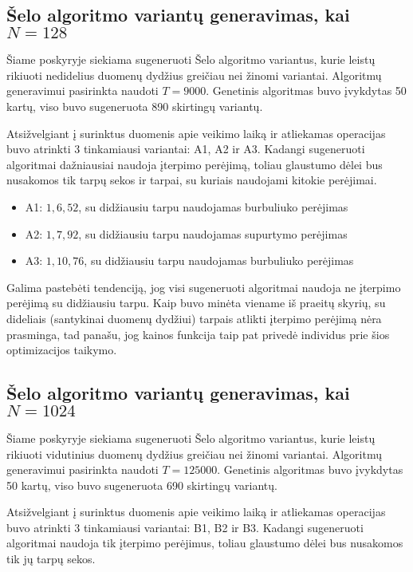 \documentclass{VUMIFInfBakalaurinis}
\begin{document}
\subsection{Šelo algoritmo variantų generavimas, kai $N = 128$}

Šiame poskyryje siekiama sugeneruoti Šelo algoritmo variantus,
kurie leistų rikiuoti nedidelius duomenų dydžius greičiau nei žinomi variantai.
Algoritmų generavimui pasirinkta naudoti $T = 9000$.
Genetinis algoritmas buvo įvykdytas 50 kartų, viso buvo sugeneruota 890 skirtingų variantų.

Atsižvelgiant į surinktus duomenis apie veikimo laiką ir atliekamas operacijas buvo atrinkti 3 tinkamiausi variantai: A1, A2 ir A3.
Kadangi sugeneruoti algoritmai dažniausiai naudoja įterpimo perėjimą, toliau glaustumo dėlei bus nusakomos tik tarpų sekos ir tarpai, su kuriais naudojami kitokie perėjimai.

\begin{itemize}
  \item A1: $1, 6, 52$, su didžiausiu tarpu naudojamas burbuliuko perėjimas
  \item A2: $1, 7, 92$, su didžiausiu tarpu naudojamas supurtymo perėjimas
  \item A3: $1, 10, 76 $, su didžiausiu tarpu naudojamas burbuliuko perėjimas
\end{itemize}

Galima pastebėti tendenciją, jog visi sugeneruoti algoritmai naudoja ne įterpimo perėjimą su didžiausiu tarpu.
Kaip buvo minėta viename iš praeitų skyrių, su dideliais (santykinai duomenų dydžiui) tarpais atlikti įterpimo perėjimą nėra prasminga,
tad panašu, jog kainos funkcija taip pat privedė individus prie šios optimizacijos taikymo.

\subsection{Šelo algoritmo variantų generavimas, kai $N = 1024$}

Šiame poskyryje siekiama sugeneruoti Šelo algoritmo variantus,
kurie leistų rikiuoti vidutinius duomenų dydžius greičiau nei žinomi variantai.
Algoritmų generavimui pasirinkta naudoti $T = 125000$.
Genetinis algoritmas buvo įvykdytas 50 kartų, viso buvo sugeneruota 690 skirtingų variantų.

Atsižvelgiant į surinktus duomenis apie veikimo laiką ir atliekamas operacijas buvo atrinkti 3 tinkamiausi variantai: B1, B2 ir B3. 
Kadangi sugeneruoti algoritmai naudoja tik įterpimo perėjimus, toliau glaustumo dėlei bus nusakomos tik jų tarpų sekos.
\end{document}
